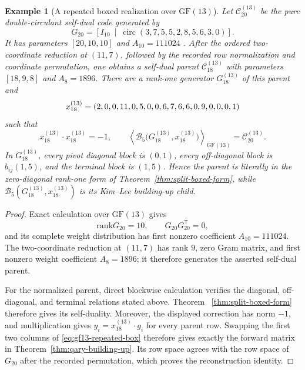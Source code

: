 \documentclass[12pt]{article}
\newtheorem{example}{Example}[section]
\newcommand{\GF}[1]{\ensuremath{\mathrm{GF}(#1)}}
\newcommand{\rank}{\mathrm{rank}}
\begin{document}
\begin{example}[A repeated boxed realization over
\texorpdfstring{\(\GF{13}\)}{GF(13)}]
\label{ex:gf13-repeated-realization}
\rm
Let \(\mathcal C_{20}^{(13)}\) be the pure double-circulant self-dual code generated
by
\[
G_{20}=\left[I_{10}\ \middle|\
\operatorname{circ}(3,7,5,5,2,8,5,6,3,0)\right].
\]
It has parameters \([20,10,10]\) and \(A_{10}=111024\)
\cite{BetsumiyaEtAl}.  After the ordered two-coordinate reduction at
\((11,7)\), followed by the recorded row normalization and coordinate
permutation, one obtains a self-dual parent \(\mathcal C_{18}^{(13)}\) with parameters
\([18,9,8]\) and \(A_8=1896\).  There are a rank-one generator
\(G_{18}^{(13)}\) of this parent and
\[
x_{18}^{(13)}=(2,0,0,11,0,5,0,0,6,7,6,6,0,9,0,0,0,1)
\]
such that
\[
x_{18}^{(13)}\cdot x_{18}^{(13)}=-1,\qquad
\left\langle\mathcal B_5
 \bigl(G_{18}^{(13)},x_{18}^{(13)}\bigr)\right\rangle_{\GF{13}}
 =\mathcal C_{20}^{(13)}.
\]
In \(G_{18}^{(13)}\), every pivot diagonal block is \((0,1)\), every
off-diagonal block is \(b_{ij}(1,5)\), and the terminal block is \((1,5)\).
Hence the parent is literally in the zero-diagonal rank-one form of
Theorem~\ref{thm:split-boxed-form}, while
\(\mathcal B_5(G_{18}^{(13)},x_{18}^{(13)})\) is its Kim--Lee
building-up child.
\end{example}

\begin{proof}
Exact calculation over \(\GF{13}\) gives
\[
\rank G_{20}=10,\qquad G_{20}G_{20}^{\mathsf T}=0,
\]
and its complete weight distribution has first nonzero coefficient
\(A_{10}=111024\).  The two-coordinate reduction at \((11,7)\) has rank
\(9\), zero Gram matrix, and first nonzero weight coefficient
\(A_8=1896\); it therefore generates the asserted self-dual parent.

For the normalized parent, direct blockwise calculation verifies the
diagonal, off-diagonal, and terminal relations stated above.  Theorem~
\ref{thm:split-boxed-form} therefore gives its self-duality.  Moreover,
the displayed correction has norm \(-1\), and multiplication gives
\(y_i=x_{18}^{(13)}\cdot g_i\) for every parent row.  Swapping the first two
columns of \eqref{eq:gf13-repeated-box} therefore gives exactly the forward
matrix in Theorem~\ref{thm:qary-building-up}.  Its row space agrees with the
row space of \(G_{20}\) after the recorded permutation, which proves the
reconstruction identity.
\end{proof}
\end{document}
